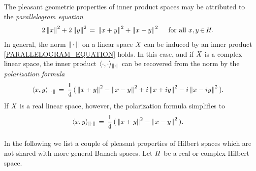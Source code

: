 \documentclass[11pt,twoside]{article}
\begin{document}
\subparagraph{}
The pleasant geometric properties of inner product spaces
may be attributed to the \textit{parallelogram equation}
\begin{equation}\label{PARALLELOGRAM_EQUATION}
2 \left\lVert x \right\rVert^2 + 2 \left\lVert y \right\rVert^2 \,=\, \left\lVert x+y \right\rVert^2 + \left\lVert x-y \right\rVert^2
\quad \mbox{ for all } x,y {\,\in\,} \mathit{H}.
\end{equation}
In general,
the norm $\left\lVert \,\cdot\, \right\rVert$ on a linear space $\mathit{X}$
can be induced by an inner product
\iff \eqref{PARALLELOGRAM_EQUATION} holds.
In this case,
and if $\mathit{X}$ is a complex linear space,
the inner product $\langle \cdot,\cdot \rangle_{\left\lVert \cdot \right\rVert}$
can be recovered from the norm by the \textit{polarization formula}
\[
\langle x,y \rangle_{\left\lVert \cdot \right\rVert}
\,=\,
\frac{1}{4} \,
(\,
\left\lVert x + y \right\rVert^2 - \left\lVert x-y \right\rVert^2 +i \left\lVert x+iy \right\rVert^2 - i \left\lVert x-iy \right\rVert^2
\,).
\]
If $\mathit{X}$ is a real linear space,
however,
the polarization formula simplifies to
\[
\langle x,y \rangle_{\left\lVert \cdot \right\rVert} \,=\,
\frac{1}{4} \,
(\,
\left\lVert x + y \right\rVert^2 - \left\lVert x-y \right\rVert^2
\,).
\]

\paragraph{}
In the following we list a couple of pleasant properties of Hilbert spaces
which are not shared with more general Banach spaces.
Let $\mathit{H}$ be a real or complex Hilbert space.
\end{document}
